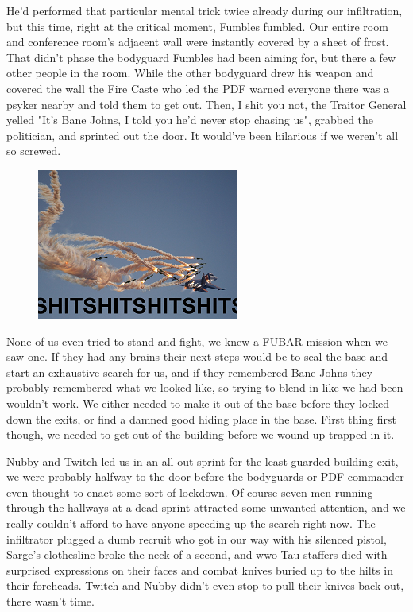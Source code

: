 He'd performed that particular mental trick twice already during our infiltration, but this time, right at the critical moment, Fumbles fumbled. 
Our entire room and conference room's adjacent wall were instantly covered by a sheet of frost. 
That didn't phase the bodyguard Fumbles had been aiming for, but there a few other people in the room. 
While the other bodyguard drew his weapon and covered the wall the Fire Caste who led the PDF warned everyone there was a psyker nearby and told them to get out. 
Then, I shit you not, the Traitor General yelled "It's Bane Johns, I told you he'd never stop chasing us", grabbed the politician, and sprinted out the door. 
It would've been hilarious if we weren't all so screwed.

\begin{figure}
	\begin{center}
		\includegraphics[width=\figwidth]{pics/10/52.png}
	\end{center}
\end{figure}
None of us even tried to stand and fight, we knew a FUBAR mission when we saw one. 
If they had any brains their next steps would be to seal the base and start an exhaustive search for us, and if they remembered Bane Johns they probably remembered what we looked like, so trying to blend in like we had been wouldn't work. 
We either needed to make it out of the base before they locked down the exits, or find a damned good hiding place in the base. 
First thing first though, we needed to get out of the building before we wound up trapped in it.

Nubby and Twitch led us in an all-out sprint for the least guarded building exit, we were probably halfway to the door before the bodyguards or PDF commander even thought to enact some sort of lockdown. 
Of course seven men running through the hallways at a dead sprint attracted some unwanted attention, and we really couldn't afford to have anyone speeding up the search right now. 
The infiltrator plugged a dumb recruit who got in our way with his silenced pistol, Sarge's clothesline broke the neck of a second, and wwo Tau staffers died with surprised expressions on their faces and combat knives buried up to the hilts in their foreheads. 
Twitch and Nubby didn't even stop to pull their knives back out, there wasn't time. 


